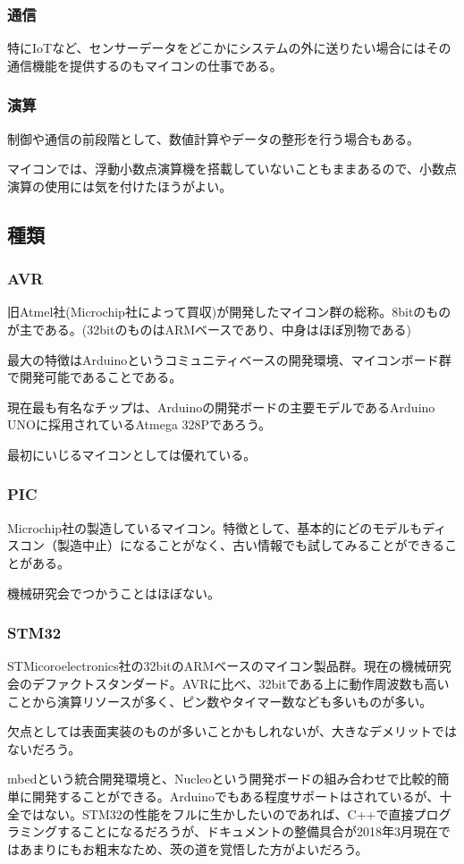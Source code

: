 \documentclass[a4paper,titlepage]{ujarticle}
\begin{document}
\subsubsection{通信}
特にIoTなど、センサーデータをどこかにシステムの外に送りたい場合にはその通信機能を提供するのもマイコンの仕事である。
\subsubsection{演算}
制御や通信の前段階として、数値計算やデータの整形を行う場合もある。

マイコンでは、浮動小数点演算機を搭載していないこともままあるので、小数点演算の使用には気を付けたほうがよい。
\subsection{種類}
\subsubsection{AVR}
旧Atmel社(Microchip社によって買収)が開発したマイコン群の総称。8bitのものが主である。(32bitのものはARMベースであり、中身はほぼ別物である)

最大の特徴はArduinoというコミュニティベースの開発環境、マイコンボード群で開発可能であることである。

現在最も有名なチップは、Arduinoの開発ボードの主要モデルであるArduino UNOに採用されているAtmega 328Pであろう。

最初にいじるマイコンとしては優れている。
\subsubsection{PIC}
Microchip社の製造しているマイコン。特徴として、基本的にどのモデルもディスコン（製造中止）になることがなく、古い情報でも試してみることができることがある。

機械研究会でつかうことはほぼない。
\subsubsection{STM32}
STMicoroelectronics社の32bitのARMベースのマイコン製品群。現在の機械研究会のデファクトスタンダード。AVRに比べ、32bitである上に動作周波数も高いことから演算リソースが多く、ピン数やタイマー数なども多いものが多い。

欠点としては表面実装のものが多いことかもしれないが、大きなデメリットではないだろう。

mbedという統合開発環境と、Nucleoという開発ボードの組み合わせで比較的簡単に開発することができる。Arduinoでもある程度サポートはされているが、十全ではない。STM32の性能をフルに生かしたいのであれば、C++で直接プログラミングすることになるだろうが、ドキュメントの整備具合が2018年3月現在ではあまりにもお粗末なため、茨の道を覚悟した方がよいだろう。
\end{document}
